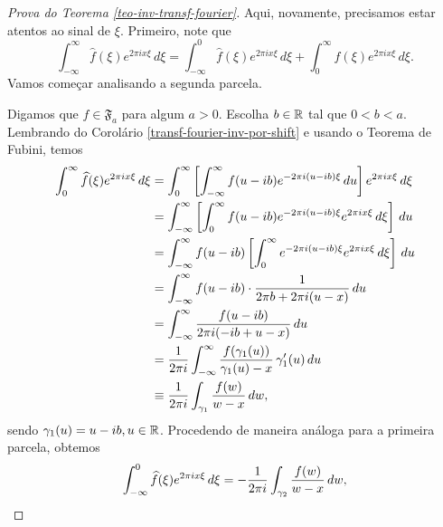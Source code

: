         \begin{proof}[Prova do Teorema \ref{teo-inv-transf-fourier}]
            Aqui, novamente, precisamos estar atentos ao sinal de $\xi$. Primeiro, note que
            \begin{equation*}
                \int_{-\infty}^{\infty} \widehat{f}(\xi) e^{2\pi ix\xi} \, d\xi 
                = \int_{-\infty}^{0} \widehat{f}(\xi) e^{2\pi ix\xi} \, d\xi 
                + \int_{0}^{\infty} \widehat{f}(\xi) e^{2\pi ix\xi} \, d\xi.
            \end{equation*}
            Vamos começar analisando a segunda parcela.
            
            Digamos que $f\in\mathfrak{F}_a$ para algum $a>0$. Escolha $b\in\mathbb{R}$ tal que $0 < b < a$.
            Lembrando do Corolário \ref{transf-fourier-inv-por-shift} e usando o Teorema de Fubini, temos
            \begin{align*}
                \int_{0}^{\infty} \widehat{f}(\xi) e^{2\pi ix\xi} \, d\xi
                &= \int_{0}^{\infty} \left[ \int_{-\infty}^{\infty} f(u-ib)e^{-2\pi i(u-ib)\xi} \, du \right] 
                    e^{2\pi ix\xi} \, d\xi \\
                &= \int_{-\infty}^{\infty} \left[ \int_{0}^{\infty} f(u-ib)e^{-2\pi i(u-ib)\xi}e^{2\pi ix\xi} \, d\xi
                    \right] \, du \\
                &= \int_{-\infty}^{\infty} f(u-ib) \left[ \int_{0}^{\infty} e^{-2\pi i(u-ib)\xi}e^{2\pi ix\xi} \, d\xi
                    \right] \, du \\
                &= \int_{-\infty}^{\infty} f(u-ib)\cdot\frac{1}{2\pi b + 2\pi i(u-x)} \, du \\
                &= \int_{-\infty}^{\infty} \frac{f(u-ib)}{2\pi i (-ib + u - x)} \, du \\
                &= \frac{1}{2\pi i} \int_{-\infty}^{\infty} \frac{f(\gamma_1(u))}{\gamma_1(u)-x}\, \gamma_1'(u) \, du \\
                &\equiv \frac{1}{2\pi i}\int_{\gamma_1} \frac{f(w)}{w-x} \, dw,
            \end{align*}
            sendo $\gamma_1(u) = u-ib, u\in\mathbb{R}$. Procedendo de maneira análoga para a primeira parcela, obtemos
            \begin{equation*}
                \int_{-\infty}^0 \widehat{f}(\xi) e^{2\pi ix\xi} \, d\xi 
                = -\frac{1}{2\pi i}\int_{\gamma_2} \frac{f(w)}{w-x} \, dw,
            \end{equation*}

\end{proof}
